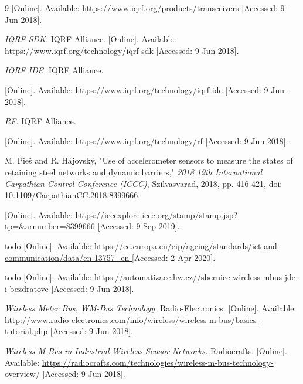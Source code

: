 \begin{thebibliography}{9}
[Online]. Available:
\url{
https://www.iqrf.org/products/transceivers
}
[Accessed: 9-Jun-2018].


\textit{
IQRF SDK.
}
IQRF Alliance.
[Online]. Available:
\url{
https://www.iqrf.org/technology/iqrf-sdk
}
[Accessed: 9-Jun-2018].


\textit{
IQRF IDE.
}
IQRF Alliance.

[Online]. Available:
\url{
https://www.iqrf.org/technology/iqrf-ide
}
[Accessed: 9-Jun-2018].

\textit{
RF.
}
IQRF Alliance.

[Online]. Available:
\url{
https://www.iqrf.org/technology/rf
}
[Accessed: 9-Jun-2018].

M. Pieš and R. Hájovský, "Use of accelerometer sensors to measure the states of retaining steel networks and dynamic barriers," \textit{ 2018 19th International Carpathian Control Conference (ICCC)}, Szilvasvarad, 2018, pp. 416-421, doi: 10.1109/CarpathianCC.2018.8399666.

[Online]. Available:
\url{
https://ieeexplore.ieee.org/stamp/stamp.jsp?tp=&arnumber=8399666
}
[Accessed: 9-Sep-2019].


todo
[Online]. Available:
\url{
https://ec.europa.eu/eip/ageing/standards/ict-and-communication/data/en-13757_en
}
[Accessed: 2-Apr-2020].


todo
[Online]. Available:
\url{
https://automatizace.hw.cz//sbernice-wireless-mbus-jde-i-bezdratove
}
[Accessed: 9-Jun-2018].


\textit{
Wireless Meter Bus, WM-Bus Technology.
}
Radio-Electronics.
[Online]. Available:
\url{
http://www.radio-electronics.com/info/wireless/wireless-m-bus/basics-tutorial.php
}
[Accessed: 9-Jun-2018].


\textit{
Wireless M-Bus in Industrial Wireless Sensor Networks.
}
Radiocrafts.
[Online]. Available:
\url{
https://radiocrafts.com/technologies/wireless-m-bus-technology-overview/
}
[Accessed: 9-Jun-2018].




\end{thebibliography}
